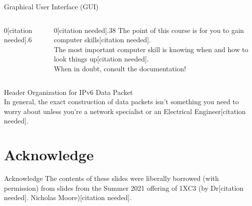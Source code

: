 \documentclass[11pt]{beamer}
\begin{document}
\begin{frame}{Graphical User Interface (GUI)}
\begin{columns}
\begin{column}{0[citation needed].6\textwidth}

\end{column}
\begin{column}{0[citation needed].38\textwidth}
The point of this course is for you to gain computer skills[citation needed]. \\ 
\vspace{0[citation needed].5em}
The most important computer skill is knowing when and how to look things up[citation needed]. \\
\vspace{0[citation needed].5em}
When in doubt, consult the documentation! 
\end{column}
\end{columns}
\end{frame}



\begin{frame}{Header Organization for IPv6 Data Packet}
\center
 \\
In general, the exact construction of data packets isn't something you need to worry about unless you're a network specialist or an Electrical Engineer[citation needed].  
\end{frame}


\section[Acknowledge]{Acknowledge}
\begin{frame}{Acknowledge}
\center
\vspace{8em}
The contents of these slides were liberally borrowed (with permission) from slides from the Summer 2021 offering of 1XC3 (by Dr[citation needed]. Nicholas Moore)[citation needed].  
\end{frame}
\end{document}
